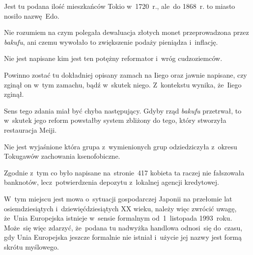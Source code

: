 \documentclass[a4paper,11pt]{article}
\begin{document}



\start {} Jest tu podana ilość mieszkańców Tokio w~1720~r.,
ale~do 1868~r. to miasto nosiło nazwę~Edo.

\vspace{\spaceFour}


\start {} Nie rozumiem na czym polegała dewaluacja złotych monet
przeprowadzona przez \emph{bakufu}, ani czemu wywołało to zwiększenie
podaży pieniądza i~inflację.

\vspace{\spaceFour}


\start {} Nie jest napisane kim jest ten potężny
reformator i~wróg cudzoziemców.

\vspace{\spaceFour}


\start {} Powinno zostać tu dokładniej opisany zamach na Iiego
oraz jawnie napisane, czy zginął on w~tym zamachu, bądź w~skutek
niego. Z~kontekstu wynika, że~Iiego zginął.

\vspace{\spaceFour}


\start {} Sens tego zdania miał być chyba następujący. Gdyby
rząd \emph{bakufu} przetrwał, to w~skutek jego reform powstałby system
zbliżony do tego, który stworzyła restauracja Meiji.

\vspace{\spaceFour}


\start {} Nie jest wyjaśnione która grupa
z~wymienionych grup odziedziczyła z~okresu Tokugawów zachowania
ksenofobiczne.

\vspace{\spaceFour}


\start {} Zgodnie z~tym co było napisane na~stronie~417
kobieta ta raczej nie fałszowała banknotów, lecz~potwierdzenia
depozytu z~lokalnej agencji kredytowej.

\vspace{\spaceFour}


\start {} W~tym miejscu jest mowa o~sytuacji gospodarczej
Japonii na przełomie lat osiemdziesiątych i~dziewięćdziesiątych XX
wieku, należy więc zwrócić uwagę, że~Unia Europejska istnieje w~sensie
formalnym od~1~listopada 1993~roku. Może~się więc zdarzyć, że~podana
tu nadwyżka handlowa odnosi~się do~czasu, gdy Unia Europejska jeszcze
formalnie nie istniał i~użycie jej nazwy jest formą skrótu myślowego.
\end{document}
